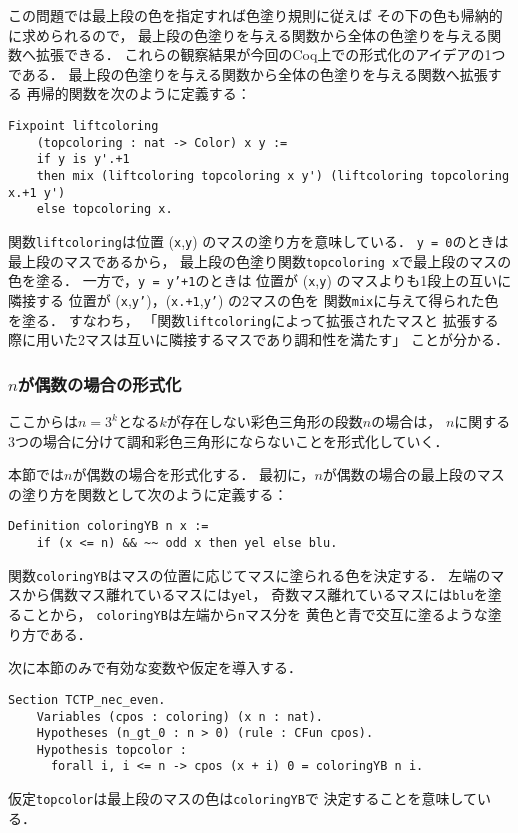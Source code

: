 この問題では最上段の色を指定すれば色塗り規則に従えば
その下の色も帰納的に求められるので，
最上段の色塗りを与える関数から全体の色塗りを与える関数へ拡張できる．
これらの観察結果が今回のCoq上での形式化のアイデアの1つである．
最上段の色塗りを与える関数から全体の色塗りを与える関数へ拡張する
再帰的関数を次のように定義する：
\begin{lstlisting}[language=Coq]
  Fixpoint liftcoloring
    (topcoloring : nat -> Color) x y :=
    if y is y'.+1
    then mix (liftcoloring topcoloring x y') (liftcoloring topcoloring x.+1 y')
    else topcoloring x.
\end{lstlisting}
関数{\tt{liftcoloring}}は位置 ({\tt{x}},{\tt{y}}) のマスの塗り方を意味している．
{\tt{y = 0}}のときは最上段のマスであるから，
最上段の色塗り関数{\tt{topcoloring x}}で最上段のマスの色を塗る．
一方で，{\tt{y = y'+1}}のときは
位置が ({\tt{x}},{\tt{y}}) のマスよりも1段上の互いに隣接する
位置が ({\tt{x}},{\tt{y'}})，({\tt{x.+1}},{\tt{y'}}) の2マスの色を
関数{\tt{mix}}に与えて得られた色を塗る．
すなわち，
「関数{\tt{liftcoloring}}によって拡張されたマスと
  拡張する際に用いた2マスは互いに隣接するマスであり調和性を満たす」
ことが分かる．

\subsubsection{$n$が偶数の場合の形式化} \label{sec:even}
ここからは$n=3^k$となる$k$が存在しない彩色三角形の段数$n$の場合は，
$n$に関する3つの場合に分けて調和彩色三角形にならないことを形式化していく．

本節では$n$が偶数の場合を形式化する．
最初に，$n$が偶数の場合の最上段のマスの塗り方を関数として次のように定義する：
\begin{lstlisting}[language=Coq]
  Definition coloringYB n x :=
    if (x <= n) && ~~ odd x then yel else blu.
\end{lstlisting}
関数{\tt{coloringYB}}はマスの位置に応じてマスに塗られる色を決定する．
左端のマスから偶数マス離れているマスには{\tt{yel}}，
奇数マス離れているマスには{\tt{blu}}を塗ることから，
{\tt{coloringYB}}は左端から{\tt{n}}マス分を
黄色と青で交互に塗るような塗り方である．

次に本節のみで有効な変数や仮定を導入する．
\begin{lstlisting}[language=Coq]
  Section TCTP_nec_even.
    Variables (cpos : coloring) (x n : nat).
    Hypotheses (n_gt_0 : n > 0) (rule : CFun cpos).
    Hypothesis topcolor :
      forall i, i <= n -> cpos (x + i) 0 = coloringYB n i.
\end{lstlisting}
仮定{\tt{topcolor}}は最上段のマスの色は{\tt{coloringYB}}で
決定することを意味している．

